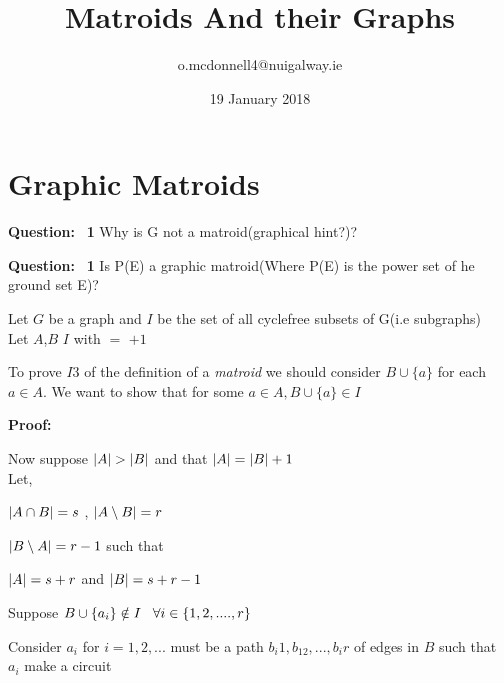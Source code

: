 \documentclass{article}
\title{Matroids And their Graphs}
\author{o.mcdonnell4@nuigalway.ie }
\date{19 January 2018}
\theoremstyle{plain}
\theoremstyle{definition}
\theoremstyle{remark}
\newcounter{Question}
\newcommand\Question{%
    \textbf{Question:}~%
    \setcounter{Question}{0}%
}
\newcommand\Proof{%
    \textbf{Proof:}~%
}
\begin{document}
\maketitle
 
 \section{Graphic Matroids}
 
 \noindent\Question \textbf{1}
 Why is G not a matroid(graphical hint?)?
 
 \vspace{2mm}
 
 \noindent\Question \textbf{1}
 Is P(E) a graphic matroid(Where P(E) is the power set of he ground set E)?
 
 \vspace{5mm}
 
 \noindent Let $G$ be a graph and $I$ be the set of all cyclefree subsets of G(i.e subgraphs)\\
 Let $A$,$B$ \in $ I $ with  $ = $  $ + 1$
 
 \vspace{3mm}
 
 \noindent To prove $ I3 $ of the definition of a \textit{matroid} we should consider $ B \cup \{a \} $ for each $ a \in A $. We want to show that for some $ a \in A , B \cup \{a \} \in I $ 
 
 \vspace{3mm}
 
 \noindent\Proof
 
 \noindent Now suppose $ \abs{A}  >  \abs{B} $ and that $\abs{A}  =  \abs{B} + 1$\\
 Let,
 
 $ \abs{A \cap B} = s $ , $\abs{A \setminus B} = r$
 
 $ \abs{B \setminus A} = r - 1$ such that 
 
 $ \abs{A} = s + r $ and $ \abs{B} = s + r - 1$
 
 \vspace{3mm}
 
 \noindent Suppose $ B \cup \{ a_i \} \notin I \hspace{3mm}\forall i \in \{ 1,2,....,r \}$
 
 \vspace{2mm}
 
 \noindent Consider $ a_i $ for $ i = 1, 2,... $ must be a path $ b_i1, b_12, ... , b_ir $ of edges in $B$ such that $ a_i $ make a circuit
 
\end{document}
